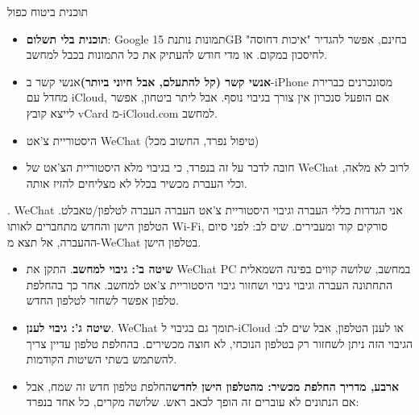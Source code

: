 
תוכנית ביטוח כפול


\begin{itemize}
  \item \textbf{תוכנית בלי תשלום}: Google תמונות נותנת 15GB בחינם, אפשר להגדיר "איכות דחוסה" לחיסכון במקום. או מדי חודש להעתיק את כל התמונות בכבל למחשב.
  \item \textbf{אנשי קשר (קל להתעלם, אבל חיוני ביותר)}אנשי קשר ב-iPhone מסונכרנים כברירת מחדל עם iCloud, אם הופעל סנכרון אין צורך בגיבוי נוסף. אבל ליתר ביטחון, אפשר לייצא קובץ vCard מ-iCloud.com למחשב.
\end{itemize}


\begin{itemize}
  \item היסטוריית צ'אט WeChat (טיפול נפרד, החשוב מכל)
  \item חובה לדבר על זה בנפרד, כי בגיבוי מלא היסטוריית הצ'אט של WeChat לרוב לא מלאה, וכלי העברת מכשיר בכלל לא מצליחים להזיז אותה.
\end{itemize}


. WeChat אני הגדרות כללי העברה וגיבוי היסטוריית צ'אט העברה העברה לטלפון/טאבלט. הטלפון הישן והחדש מתחברים לאותו Wi-Fi, סורקים קוד ומעבירים. שים לב: לפני סיום ההעברה, אל תצא מ-WeChat בטלפון הישן.

\begin{itemize}
  \item \textbf{שיטה ב': גיבוי למחשב}. התקן את WeChat PC במחשב, שלושה קווים בפינה השמאלית התחתונה העברה וגיבוי גיבוי ושחזור גיבוי היסטוריית צ'אט למחשב. אחר כך בהחלפת טלפון אפשר לשחזר לטלפון החדש.
  \item \textbf{שיטה ג': גיבוי לענן}. WeChat תומך גם בגיבוי ל-iCloud או לענן הטלפון, אבל שים לב: הגיבוי הזה ניתן לשחזור רק בטלפון הנוכחי, לא חוצה מכשירים. בהחלפת טלפון עדיין צריך להשתמש בשתי השיטות הקודמות.
  \item \textbf{ארבע, מדריך החלפת מכשיר: מהטלפון הישן לחדש}החלפת טלפון חדש זה שמח, אבל אם הנתונים לא עוברים זה הופך לכאב ראש. שלושה מקרים, כל אחד בנפרד:
\end{itemize}

